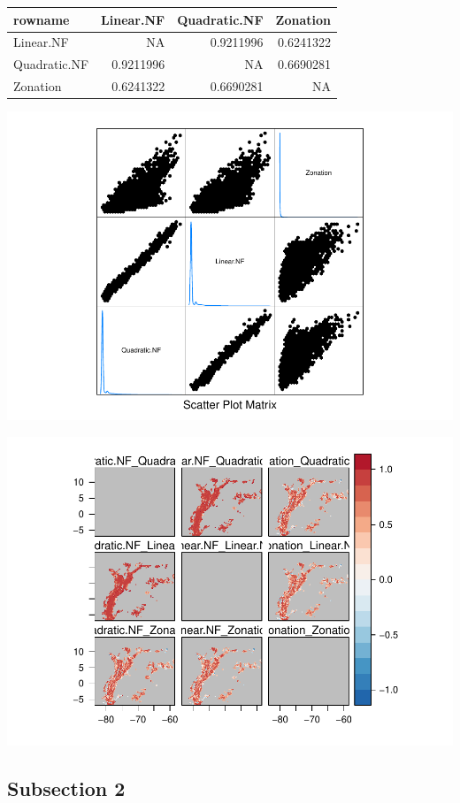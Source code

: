 \documentclass[]{article}
\begin{document}
\begin{table}[H]
\centering
\begin{tabular}{lrrr}
\toprule
rowname & Linear.NF & Quadratic.NF & Zonation\\
\midrule
Linear.NF & NA & 0.9211996 & 0.6241322\\
Quadratic.NF & 0.9211996 & NA & 0.6690281\\
Zonation & 0.6241322 & 0.6690281 & NA\\
\bottomrule
\end{tabular}
\end{table}

\includegraphics{NFPaper_files/figure-latex/unnamed-chunk-7-1.pdf}

\includegraphics{NFPaper_files/figure-latex/unnamed-chunk-8-1.pdf}

\hypertarget{subsection-2}{%
\subsection*{Subsection 2}\label{subsection-2}}
\end{document}
